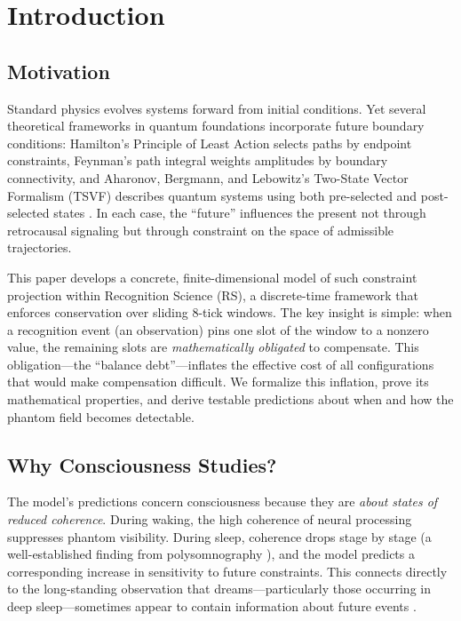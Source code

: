 \documentclass[11pt, a4paper]{article}
\theoremstyle{definition}
\theoremstyle{remark}
\begin{document}
\tableofcontents

\section{Introduction}\label{sec:intro}

\subsection{Motivation}

Standard physics evolves systems forward from initial conditions.
Yet several theoretical frameworks in quantum foundations
incorporate future boundary conditions: Hamilton's Principle of
Least Action selects paths by endpoint constraints, Feynman's path
integral weights amplitudes by boundary connectivity, and
Aharonov, Bergmann, and Lebowitz's Two-State Vector Formalism (TSVF)
describes quantum systems using both pre-selected and post-selected
states \cite{Aharonov1964,Aharonov2008}. In each case, the
``future'' influences the present not through retrocausal
signaling but through constraint on the space of admissible
trajectories.

This paper develops a concrete, finite-dimensional model of such
constraint projection within Recognition Science (RS), a
discrete-time framework that enforces conservation over sliding
8-tick windows. The key insight is simple: when a recognition
event (an observation) pins one slot of the window to a nonzero
value, the remaining slots are \emph{mathematically obligated} to
compensate. This obligation---the ``balance debt''---inflates the
effective cost of all configurations that would make compensation
difficult. We formalize this inflation, prove its mathematical
properties, and derive testable predictions about when and how
the phantom field becomes detectable.

\subsection{Why Consciousness Studies?}

The model's predictions concern consciousness because they are
\emph{about states of reduced coherence}. During waking, the high
coherence of neural processing suppresses phantom visibility. During
sleep, coherence drops stage by stage (a well-established finding
from polysomnography \cite{Hobson2005,Walker2017}), and the model
predicts a corresponding increase in sensitivity to future
constraints. This connects directly to the long-standing observation
that dreams---particularly those occurring in deep sleep---sometimes
appear to contain information about future events
\cite{Rhine1962,VanDeCastle1994,Kramer2007}.
\end{document}
